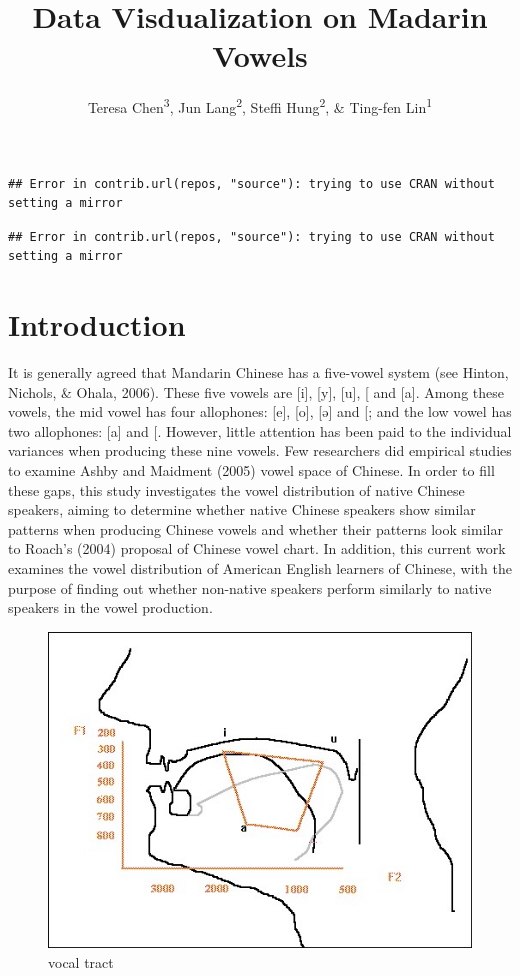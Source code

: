 \documentclass[man, fleqn, noextraspace]{apa6}
\title{Data Visdualization on Madarin Vowels}
\author{Teresa Chen\textsuperscript{3}, Jun Lang\textsuperscript{2}, Steffi
Hung\textsuperscript{2}, \& Ting-fen Lin\textsuperscript{1}}
\date{}
\begin{document}
\maketitle

{
\setcounter{tocdepth}{5}
\tableofcontents
}
\begin{verbatim}
## Error in contrib.url(repos, "source"): trying to use CRAN without setting a mirror
\end{verbatim}

\begin{verbatim}
## Error in contrib.url(repos, "source"): trying to use CRAN without setting a mirror
\end{verbatim}

\newpage

\section{Introduction}\label{introduction}

It is generally agreed that Mandarin Chinese has a five-vowel system
(see Hinton, Nichols, \& Ohala, 2006). These five vowels are {[}i{]},
{[}y{]}, {[}u{]}, {[}\ipatext{ə}{]} and {[}a{]}. Among these vowels, the
mid vowel has four allophones: {[}e{]}, {[}o{]}, {[}ə{]} and
{[}\ipatext{ɤ}{]}; and the low vowel has two allophones: {[}a{]} and
{[}\ipatext{ɑ}{]}. However, little attention has been paid to the
individual variances when producing these nine vowels. Few researchers
did empirical studies to examine Ashby and Maidment (2005) vowel space
of Chinese. In order to fill these gaps, this study investigates the
vowel distribution of native Chinese speakers, aiming to determine
whether native Chinese speakers show similar patterns when producing
Chinese vowels and whether their patterns look similar to Roach's (2004)
proposal of Chinese vowel chart. In addition, this current work examines
the vowel distribution of American English learners of Chinese, with the
purpose of finding out whether non-native speakers perform similarly to
native speakers in the vowel production.

\begin{figure}
\centering
\includegraphics{picture/mouth.jpg}
\caption{vocal tract}
\end{figure}
\end{document}
